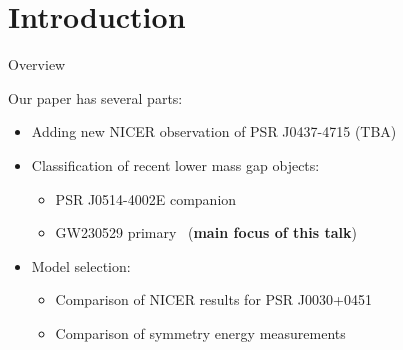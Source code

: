 \documentclass[usenames,dvipsnames,t]{beamer}
\begin{document}




\section{Introduction}

\begin{frame}{Overview}

  \def\x{4mm}
  \def\y{3mm}

  Our paper has several parts:
  \begin{itemize}
    \vspace{\x}
    \item Adding new NICER observation of PSR J0437-4715 (TBA)

    \vspace{\x}

    \item Classification of recent lower mass gap objects:
    \begin{itemize}
      \vspace{\y}
      \item  PSR J0514-4002E companion

      \vspace{\y}

      \item GW230529 primary~\cite{LIGOScientific:2024elc} (\textbf{main focus of this talk})
    \end{itemize}

    \vspace{\x}
    
    \item Model selection: 
    \begin{itemize}
      \vspace{\y}
      \item  Comparison of NICER results for PSR J0030+0451

      \vspace{\y}

      \item Comparison of symmetry energy measurements
    \end{itemize}
    
  \end{itemize}
  
\end{frame}
\end{document}
